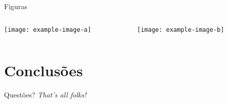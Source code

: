 \documentclass[
brazilian, %
12pt, %
]{beamer}
\begin{document}
	\begin{frame}{Figuras}
		\begin{columns}
			\begin{column}{0.5\linewidth}
				\texttt{[image: example-image-a]}
			\end{column}
			\begin{column}{0.5\linewidth}
				\texttt{[image: example-image-b]}
			\end{column}
		\end{columns}
	\end{frame}
	
	\section{Conclusões}
	\begin{frame}{Questões?}
		\centering
		\textit{That's all folks!}
	\end{frame}
	
	
\end{document}
